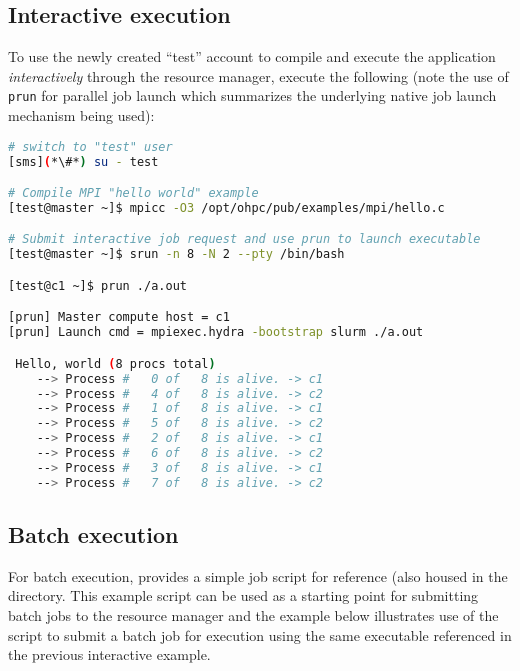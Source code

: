 \subsection{Interactive execution}
To use the newly created ``test'' account to compile and execute the
application {\em interactively} through the resource manager, execute the
following (note the use of \texttt{prun} for parallel job launch which summarizes
the underlying native job launch mechanism being used):

\begin{lstlisting}[language=bash,keywords={}]
# switch to "test" user
[sms](*\#*) su - test

# Compile MPI "hello world" example
[test@master ~]$ mpicc -O3 /opt/ohpc/pub/examples/mpi/hello.c

# Submit interactive job request and use prun to launch executable
[test@master ~]$ srun -n 8 -N 2 --pty /bin/bash

[test@c1 ~]$ prun ./a.out

[prun] Master compute host = c1
[prun] Launch cmd = mpiexec.hydra -bootstrap slurm ./a.out

 Hello, world (8 procs total)
    --> Process #   0 of   8 is alive. -> c1
    --> Process #   4 of   8 is alive. -> c2
    --> Process #   1 of   8 is alive. -> c1
    --> Process #   5 of   8 is alive. -> c2
    --> Process #   2 of   8 is alive. -> c1
    --> Process #   6 of   8 is alive. -> c2
    --> Process #   3 of   8 is alive. -> c1
    --> Process #   7 of   8 is alive. -> c2
\end{lstlisting}

\subsection{Batch execution}

For batch execution, \OHPC{} provides a simple job script for reference (also
housed in the  directory. This example script can
be used as a starting point for submitting batch jobs to the resource manager
and the example below illustrates use of the script to submit a batch job for
execution using the same executable referenced in the previous interactive example.

